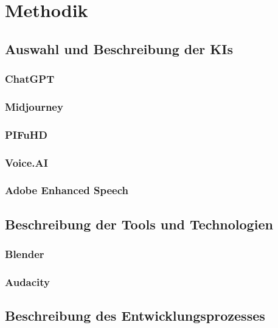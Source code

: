 \chapter{Methodik}

\section{Auswahl und Beschreibung der KIs}
\subsection{ChatGPT}
\subsection{Midjourney}
\subsection{PIFuHD}
\subsection{Voice.AI}
\subsection{Adobe Enhanced Speech}

\section{Beschreibung der Tools und Technologien}
\subsection{Blender}
\subsection{Audacity}
\section{Beschreibung des Entwicklungsprozesses}